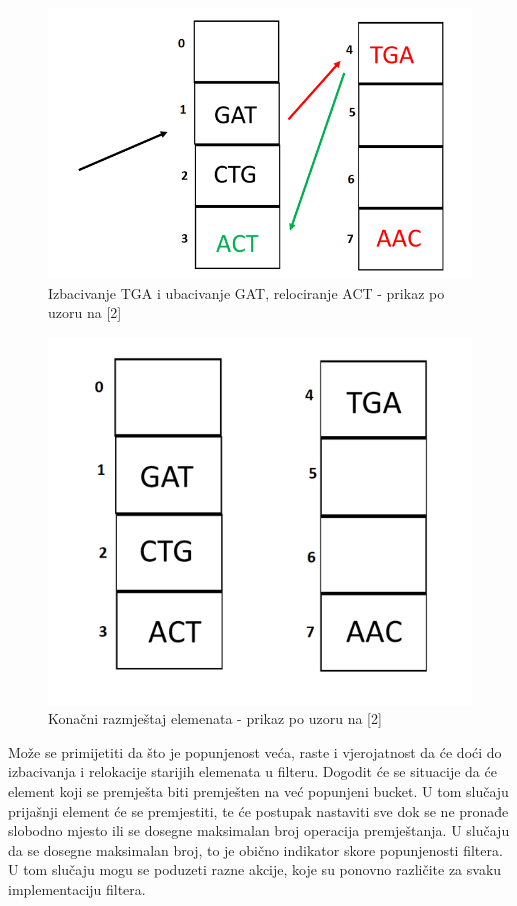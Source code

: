 \documentclass[times, utf8, seminar, numeric]{fer}
\begin{document}
\begin{figure}[H]
  \centering
  \setlength{\intextsep}{5pt}
  \includegraphics[scale = 0.4]{images/swap2.png}
  \caption{Izbacivanje TGA i ubacivanje GAT, relociranje ACT - prikaz po uzoru na [2]}
  \label{fig_swap2}
\end{figure}

\begin{figure}[H]
  \centering
  \setlength{\intextsep}{5pt}
  \includegraphics[scale = 0.4]{images/finalalign.png}
  \caption{Konačni razmještaj elemenata - prikaz po uzoru na [2]}
  \label{fig_finalalign}
\end{figure}

Može se primijetiti da što je popunjenost veća, raste i vjerojatnost da će doći do izbacivanja i relokacije starijih elemenata u filteru. Dogodit će se situacije da će element koji se premješta biti premješten na već popunjeni bucket. U tom slučaju prijašnji element će se premjestiti, te će postupak nastaviti sve dok se ne pronađe slobodno mjesto ili se dosegne maksimalan broj operacija premještanja. U slučaju da se dosegne maksimalan broj, to je obično indikator skore popunjenosti filtera. U tom slučaju mogu se poduzeti razne akcije, koje su ponovno različite za svaku implementaciju filtera. \\
\end{document}
